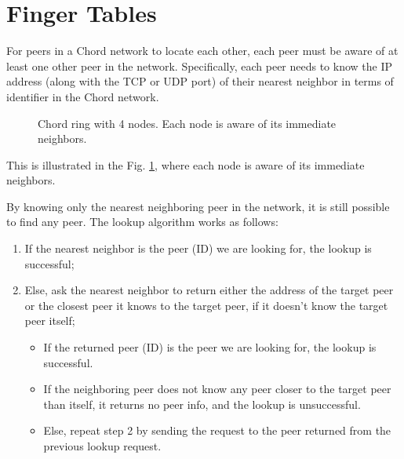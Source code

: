 \section{Finger Tables}
For peers in a Chord network to locate each other, each peer must be aware of at least one other peer in the network.
Specifically, each peer needs to know the IP address (along with the TCP or UDP port) of their nearest neighbor in terms of identifier in the Chord network.
\begin{figure}[htbp]
    \centering
{}
\caption{Chord ring with 4 nodes. Each node is aware of its immediate neighbors.}
\label{fig:chord-ring-peer-neighbours}
\end{figure}

This is illustrated in the Fig. \ref{fig:chord-ring-peer-neighbours}, where each node is aware of its immediate neighbors.

By knowing only the nearest neighboring peer in the network, it is still possible to find any peer.
The lookup algorithm works as follows:
\begin{enumerate}
    \item If the nearest neighbor is the peer (ID) we are looking for, the lookup is successful;
	\item Else, ask the nearest neighbor to return either the address of the target peer or the closest peer it knows to the target peer, if it doesn't know the target peer itself;
	\begin{itemize}
        \item If the returned peer (ID) is the peer we are looking for, the lookup is successful.
        \item If the neighboring peer does not know any peer closer to the target peer than itself, it returns no peer info, and the lookup is unsuccessful.
        \item Else, repeat step 2 by sending the request to the peer returned from the previous lookup request.
    \end{itemize}
\end{enumerate}

